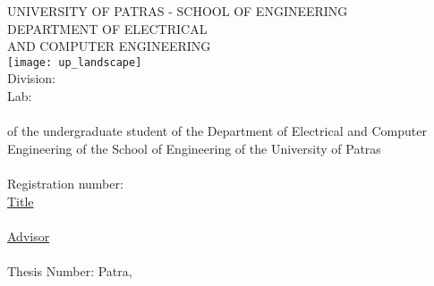 \begin{titlepage}
\begin{center}
{\large UNIVERSITY OF PATRAS - SCHOOL OF ENGINEERING}\\
\large DEPARTMENT OF ELECTRICAL\\AND COMPUTER ENGINEERING\\
\hfill \break
\texttt{[image: up\_landscape]}\\
\hfill \break
{\Large Division: \division \\
Lab: \lab }\\[1cm]

{\uline{\LARGE{\shortdoctitle }}}\\ [0.5cm]
of the undergraduate student of the Department of Electrical and Computer \\Engineering of the School of Engineering of the University of Patras\\[1cm]

{\LARGE \me }\\[0.5cm]
{\Large Registration number: \studnum}\\[1cm]

\uline{\large Title}\\[0.5cm]
\textbf{\large \doctitle }\\[1cm]
\uline{\large Advisor}\\[0.5cm]
\large \suptitle \, \supname \\[1cm]
\large{Thesis Number: }%
\vfill
\large{Patra,\monthyear}
\end{center}
\end{titlepage}